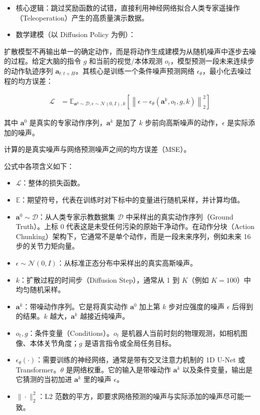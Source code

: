 \begin{itemize}
\tightlist
\item
  核心逻辑：跳过奖励函数的试错，直接利用神经网络拟合人类专家遥操作（Teleoperation）产生的高质量演示数据。
\item
  数学建模（以 Diffusion Policy 为例）：
\end{itemize}

扩散模型不再输出单一的确定动作，而是将动作生成建模为从随机噪声中逐步去噪的过程。给定大脑的指令 \(g\) 和当前的视觉/本体观测 \(o_t\)，模型预测一段未来连续步的动作轨迹序列 \(\mathbf{a}_{t:t+H}\)。其核心是训练一个条件噪声预测网络 \(\epsilon_\theta\)，最小化去噪过程的均方误差：

\[
\begin{aligned}
\mathcal{L}
&=
\mathbb{E}_{\mathbf{a}^0\sim\mathcal{D},\epsilon\sim\mathcal{N}(0,I),k}
\left[
\left\|
\epsilon-\epsilon_\theta(\mathbf{a}^k,o_t,g,k)
\right\|_2^2
\right]
\end{aligned}
\]

其中 \(\mathbf{a}^0\) 是真实的专家动作序列，\(\mathbf{a}^k\) 是加了 \(k\) 步前向高斯噪声的动作，\(\epsilon\) 是实际添加的噪声。

计算的是真实噪声与网络预测噪声之间的均方误差（MSE）。

公式中各项含义如下：

\begin{itemize}
\tightlist
\item
  \(\mathcal{L}\)：整体的损失函数。
\item
  \(\mathbb{E}\)：期望符号，代表在训练时对下标中的变量进行随机采样，并计算均值。
\item
  \(\mathbf{a}^0\sim\mathcal{D}\)：从人类专家示教数据集 \(\mathcal{D}\) 中采样出的真实动作序列（Ground Truth）。上标 0 代表这是未受任何污染的原始干净动作。在动作分块（Action Chunking）架构下，它通常不是单个动作，而是一段未来序列，例如未来 16 步的关节力矩向量。
\item
  \(\epsilon\sim\mathcal{N}(0,I)\)：从标准正态分布中采样出的真实高斯噪声。
\item
  \(k\)：扩散过程的时间步（Diffusion Step），通常从 1 到 \(K\)（例如 \(K=100\)）中均匀随机采样。
\item
  \(\mathbf{a}^k\)：带噪动作序列。它是将真实动作 \(\mathbf{a}^0\) 加上第 \(k\) 步对应强度的噪声 \(\epsilon\) 后得到的结果。\(k\) 越大，\(\mathbf{a}^k\) 越接近纯噪声。
\item
  \(o_t,g\)：条件变量（Conditions）。\(o_t\) 是机器人当前时刻的物理观测，如相机图像、本体关节角度；\(g\) 是语言指令或全局任务目标。
\item
  \(\epsilon_\theta(\cdot)\)：需要训练的神经网络，通常是带有交叉注意力机制的 1D U-Net 或 Transformer。\(\theta\) 是网络权重。它的输入是带噪动作 \(\mathbf{a}^k\) 以及条件变量，输出是它猜测的当初加进 \(\mathbf{a}^k\) 里的噪声 \(\epsilon\)。
\item
  \(\|\cdot\|_2^2\)：L2 范数的平方，即要求网络预测的噪声与实际添加的噪声尽可能一致。
\end{itemize}

